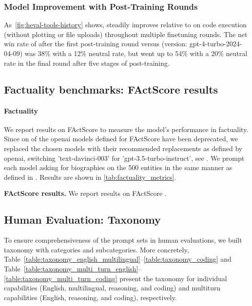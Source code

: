 \subsubsection{Model Improvement with Post-Training Rounds}

As~\cref{fig:heval-tools-history} shows, \llamathree steadily improves relative to \gptfourturbo on code execution (without plotting or file uploads) throughout multiple finetuning rounds. The net win rate of \llamathree after the first post-training round versus \gptfourturbo (version: gpt-4-turbo-2024-04-09) was 38\% with a 12\% neutral rate, but went up to 54\% with a 20\% neutral rate in the final round after five stages of post-training.




\subsection{Factuality benchmarks: FActScore results}
\paragraph{Factuality}






We report results on FActScore \citep{min2023factscore} to measure the model's performance in factuality. Since on of the openai models defined for FActScore \cite{min2023factscore} have been deprecated, we replaced the chosen models with their recommended replacements as defined by openai, switching 'text-davinci-003' for 'gpt-3.5-turbo-instruct', see \cite{openai2024deprecations}.
We prompt each model asking for biographies on the 500 entities in the same manner as defined in \cite{min2023factscore}. Results are shown in \autoref{tab:factuality_metrics}.

\begin{table}[t!]
  
  \caption{\textbf{FActScore results.} We report results on FActScore \citep{min2023factscore}.}
  \label{tab:factuality_metrics}
\end{table}



\subsection{Human Evaluation: Taxonomy}
\label{section:taxonomy_human_eval}

To ensure comprehensiveness of the prompt sets in human evaluations,
we built taxonomy with categories and subcategories.
More concretely,
Table~\ref{table:taxonomy_english_multilingual}--\ref{table:taxonomy_coding}
and Table~\ref{table:taxonomy_multi_turn_english}--\ref{table:taxonomy_multi_turn_coding}
present
the taxonomy for individual capabilities (English, multilingual, reasoning, and coding)
and multiturn capabilities (English, reasoning, and coding), respectively.

